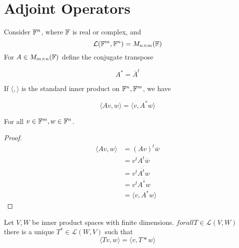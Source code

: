 \documentclass[12pt]{article}
\begin{document}
\section{Adjoint Operators}

Consider $\mathbb{F}^n$, where $\mathbb{F}$ is real or complex, and
$$\mathcal L(\mathbb{F}^m,\mathbb{F}^n) = M_{n\times m}(\mathbb{F})$$
For $A \in M_{m \times n}(\mathbb{F})$ define the conjugate transpose

$$A^* = \overline{A}^t$$

If $\langle , \rangle$ is the standard inner product on $\mathbb{F}^n, \mathbb{F}^m$, we have

$$\langle Av,w \rangle = \langle v,A^*w \rangle$$

For all $v \in \mathbb{F}^m, w \in \mathbb{F}^n$.

\begin{proof}
	\begin{align*}
		\langle Av,w \rangle &= (Av)^t\overline{w} \\
				     &= v^tA^t\overline{w} \\
				     &= v^t \overline{\overline{A^t}w} \\
				     &= v^t\overline{A^*w} \\
				     &= \langle v, A^*w \rangle
	\end{align*}
\end{proof}

\begin{thm}
	Let $V,W$ be inner product spaces with finite dimensions. $forall T \in \mathcal L(V,W)$ there is a unique $T^* \in \mathcal{L}(W,V)$ such that
	$$\langle Tv,w \rangle = \langle v,T*w \rangle$$
\end{thm}
\end{document}
